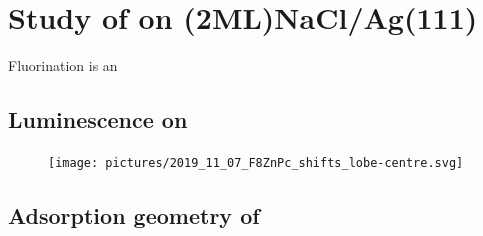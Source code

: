 








\section{Study of  on (2ML)NaCl/Ag(111)}

Fluorination is an 



\subsection{Luminescence on }


\begin{figure} [h]
    \centering
        \texttt{[image: pictures/2019\_11\_07\_F8ZnPc\_shifts\_lobe-centre.svg]}
    \caption{}
    \label{fig:opv:f8znpc-stml}
\end{figure}


\subsection{Adsorption geometry of }





